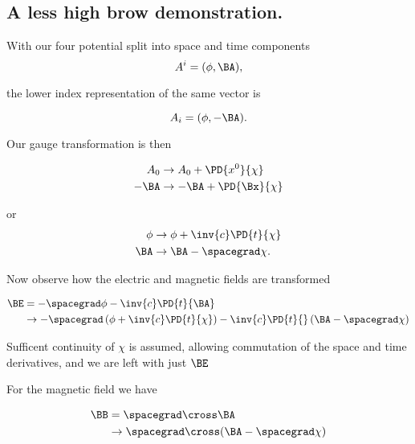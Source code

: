 \subsection{A less high brow demonstration.}

With our four potential split into space and time components
\begin{equation}\label{eqn:relativisticElectrodynamicsL10:n}
A^i = (\phi, \BA),
\end{equation}

the lower index representation of the same vector is

\begin{equation}\label{eqn:relativisticElectrodynamicsL10:n}
A_i = (\phi, -\BA).
\end{equation}

Our gauge transformation is then

\begin{align}\label{eqn:relativisticElectrodynamicsL10:n}
A_0 &\rightarrow A_0 + \PD{x^0}{\chi} \\
-\BA &\rightarrow -\BA + \PD{\Bx}{\chi}
\end{align}

or
\begin{align}\label{eqn:relativisticElectrodynamicsL10:n}
\phi &\rightarrow \phi + \inv{c}\PD{t}{\chi} \\
\BA &\rightarrow \BA - \spacegrad \chi.
\end{align}

Now observe how the electric and magnetic fields are transformed

\begin{align*}
\BE 
&= - \spacegrad \phi - \inv{c} \PD{t}{\BA} \\
&\rightarrow 
- \spacegrad \left( \phi + \inv{c}\PD{t}{\chi} \right) - \inv{c}\PD{t}{} \left( \BA - \spacegrad \chi \right) \\
\end{align*}

Sufficent continuity of $\chi$ is assumed, allowing commutation of the space and time derivatives, and we are left with just $\BE$

For the magnetic field we have

\begin{align*}
\BB 
&= \spacegrad \cross \BA  \\
&\rightarrow 
\spacegrad \cross (\BA  - \spacegrad \chi) \\
\end{align*}

